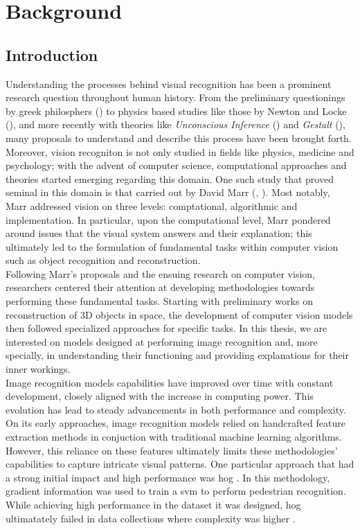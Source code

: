 \chapter{Background}
\label{ch:rel}
\chaptertoc{}
\section{Introduction}
\noindent Understanding the processes behind visual recognition has been a prominent research 
question throughout human history. From the preliminary questionings by greek  philosphers 
(\cite{finger2001origins}) to physics based studies like those by Newton and Locke 
(\cite{swenson2010optics}), and more recently with theories like \textit{Unconscious Inference} 
(\cite{gullstrand1909hemholtz}) and \textit{Gestalt} (\cite{wagemans2012century}), many proposals 
to understand and describe this process have been brought forth. Moreover, vision recogniton is not 
only studied in fields like physics, medicine and psychology; 
with the advent of computer science, computational approaches and theories started emerging 
regarding this domain. One such study that proved seminal in this domain is that carried out by 
David Marr (\cite{poggio1981marr}, \cite{marr2010vision}). Most notably, Marr addressed vision on 
three levels: comptational, algorithmic and implementation. In particular, upon the computational 
level, Marr pondered around issues that the visual system answers and their explanation; this 
ultimately led to the formulation of fundamental tasks within computer vision such as object 
recognition and reconstruction.\\

\noindent Following Marr's proposals and the ensuing research on computer vision, researchers 
centered their attention at developing methodologies towards performing these fundamental tasks.
Starting with preliminary works on reconstruction of 3D objects in space, the development of 
computer vision models then followed specialized approaches for specific tasks. In this thesis, 
we are interested on models designed at performing image recognition and, more specially, in 
understanding their functioning and providing explanations for their inner workings.\\

\noindent Image recognition models capabilities have improved over time with constant development, 
closely aligned with the increase in computing power. This evolution has lead to steady 
advancements in both performance and complexity. On its early approaches, image recognition models 
relied on handcrafted feature extraction methods  in conjuction with traditional machine learning 
algorithms. However, this reliance on these features ultimately limits these methodologies' 
capabilities to capture intricate visual patterns.
One particular approach that had a strong initial impact and high performance was \gls{hog} 
\autocite{dalal2005histograms}. In this methodology, gradient information was used to train a 
\gls{svm} to perform pedestrian recognition. While achieving high performance in the dataset it was 
designed, \gls{hog} ultimatately failed in data collections where complexity was higher 
\autocite{5975165}.\\


